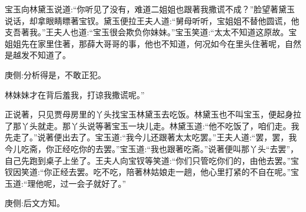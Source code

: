\begin{parag}
    宝玉向林黛玉说道:“你听见了没有，难道二姐姐也跟著我撒谎不成？”脸望著黛玉说话，却拿眼睛瞟著宝钗。黛玉便拉王夫人道:“舅母听听，宝姐姐不替他圆谎，他支吾著我。”王夫人也道:“宝玉很会欺负你妹妹。”宝玉笑道:“太太不知道这原故。宝姐姐先在家里住著，那薛大哥哥的事，他也不知道，何况如今在里头住著呢，自然是越发不知道了。\begin{note}庚侧:分析得是，不敢正犯。\end{note}林妹妹才在背后羞我，打谅我撒谎呢。”
\end{parag}


\begin{parag}
    正说著，只见贾母房里的丫头找宝玉林黛玉去吃饭。林黛玉也不叫宝玉，便起身拉了那丫头就走。那丫头说等著宝玉一块儿走。林黛玉道:“他不吃饭了，咱们走。我先走了。”说著便出去了。宝玉道:“我今儿还跟著太太吃罢。”王夫人道:“罢，罢，我今儿吃斋，你正经吃你的去罢。”宝玉道:“我也跟著吃斋。”说著便叫那丫头“去罢”，自己先跑到桌子上坐了。王夫人向宝钗等笑道:“你们只管吃你们的，由他去罢。”宝钗因笑道:“你正经去罢。吃不吃，陪著林姑娘走一趟，他心里打紧的不自在呢。”宝玉道:“理他呢，过一会子就好了。”\begin{note}庚侧:后文方知。\end{note}
\end{parag}


